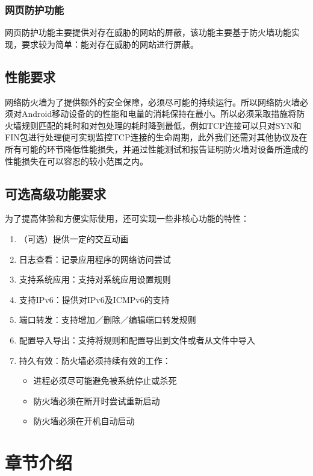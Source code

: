 \documentclass[format=final, language=chinese, degree=fyp]{hustthesis}
\begin{document}
\subsubsection{网页防护功能}

网页防护功能主要提供对存在威胁的网站的屏蔽，该功能主要基于防火墙功能实现，要求较为简单：能对存在威胁的网站进行屏蔽。

\subsection{性能要求}

网络防火墙为了提供额外的安全保障，必须尽可能的持续运行。所以网络防火墙必须对Android移动设备的的性能和电量的消耗保持在最小。所以必须采取措施将防火墙规则匹配的耗时和对包处理的耗时降到最低，例如TCP连接可以只对SYN和FIN包进行处理便可实现监控TCP连接的生命周期，此外我们还需对其他协议及在所有可能的环节降低性能损失，并通过性能测试和报告证明防火墙对设备所造成的性能损失在可以容忍的较小范围之内。

\subsection{可选高级功能要求}

为了提高体验和方便实际使用，还可实现一些非核心功能的特性：
\begin{enumerate}
	\item （可选）提供一定的交互动画
	\item 日志查看：记录应用程序的网络访问尝试
	\item 支持系统应用：支持对系统应用设置规则
	\item 支持IPv6：提供对IPv6及ICMPv6的支持
	\item 端口转发：支持增加／删除／编辑端口转发规则
	\item 配置导入导出：支持将规则和配置导出到文件或者从文件中导入
	\item 持久有效：防火墙必须持续有效的工作：
		\begin{itemize}
			\item 进程必须尽可能避免被系统停止或杀死
			\item 防火墙必须在断开时尝试重新启动
			\item 防火墙必须在开机自动启动
		\end{itemize}
\end{enumerate}


\section{章节介绍}
\end{document}
